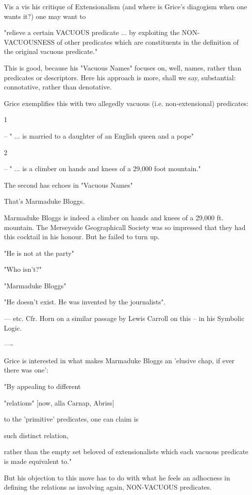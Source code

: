 \documentclass[10pt,titlepage]{book}
\begin{document}
{Vis a vis his critique of Extensionalism (and where is Grice's
diagogism when one wants it?) one may want to

"relieve a certain VACUOUS predicate ... by exploiting the
NON-VACUOUSNESS of other predicates which are constituents in the
definition of the original vacuous predicate."

This is good, because his "Vacuous Names" focuses on, well, names,
rather than predicates or descriptors. Here his approach is more, shall
we say, substantial: connotative, rather than denotative.

Grice exemplifies this with two allegedly vacuous (i.e.
non-extensional) predicates:

1

-- " ... is married to a daughter of an English queen and a pope"


2

-- " ... is a climber on hands and knees of a 29,000 foot mountain."


The second has echoes in "Vacuous Names"

That's Marmaduke Bloggs.

Marmaduke Bloggs is indeed a climber on hands and knees of a 29,000 ft.
mountain. The Merseyside Geographicall Society was so impressed that
they had this cocktail in his honour. But he failed to turn up.

"He is not at the party"

"Who isn't?"

"Marmaduke Bloggs"

"He doesn't exist. He was invented by the journalists".

--- etc. Cfr. Horn on a similar passage by Lewis Carroll on this -- in
his Symbolic Logic.

----

Grice is interested in what makes Marmaduke Bloggs an 'elusive chap, if
ever there was one':

"By appealing to different

"relations" [now, alla Carnap, Abriss]

to the 'primitive' predicates, one can claim is

such distinct relation,

rather than the empty set beloved of extensionalists
which each vacuous predicate is made equivalent to."

But his objection to this move has to do with what he feels an
adhocness in defining the relations as involving again, NON-VACUOUS
predicates.

}
\end{document}

